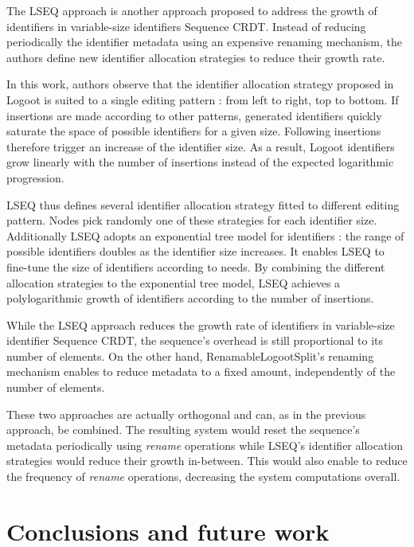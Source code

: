 \documentclass[10pt,journal,compsoc]{IEEEtran}
\begin{document}
The LSEQ approach \cite{nedelec_2013_lseq, doi:10.1002/cpe.4108} is another approach proposed to address the growth of identifiers in variable-size identifiers Sequence \ac{CRDT}. Instead of reducing periodically the identifier metadata using an expensive renaming mechanism, the authors define new identifier allocation strategies to reduce their growth rate.

In this work, authors observe that the identifier allocation strategy proposed in Logoot\cite{WeissICDCS09} is suited to a single editing pattern : from left to right, top to bottom.
If insertions are made according to other patterns, generated identifiers quickly saturate the space of possible identifiers for a given size.
Following insertions therefore trigger an increase of the identifier size.
As a result, Logoot identifiers grow linearly with the number of insertions instead of the expected logarithmic progression.

LSEQ thus defines several identifier allocation strategy fitted to different editing pattern.
Nodes pick randomly one of these strategies for each identifier size.
Additionally LSEQ adopts an exponential tree model for identifiers : the range of possible identifiers doubles as the identifier size increases.
It enables LSEQ to fine-tune the size of identifiers according to needs.
By combining the different allocation strategies to the exponential tree model, LSEQ achieves a polylogarithmic growth of identifiers according to the number of insertions.

While the LSEQ approach reduces the growth rate of identifiers in variable-size identifier Sequence \ac{CRDT}, the sequence's overhead is still proportional to its number of elements.
On the other hand, RenamableLogootSplit's renaming mechanism enables to reduce metadata to a fixed amount, independently of the number of elements.

These two approaches are actually orthogonal and can, as in the previous approach, be combined.
The resulting system would reset the sequence's metadata periodically using \emph{rename} operations while LSEQ's identifier allocation strategies would reduce their growth in-between.
This would also enable to reduce the frequency of \emph{rename} operations, decreasing the system computations overall.

\section{Conclusions and future work}
\end{document}
